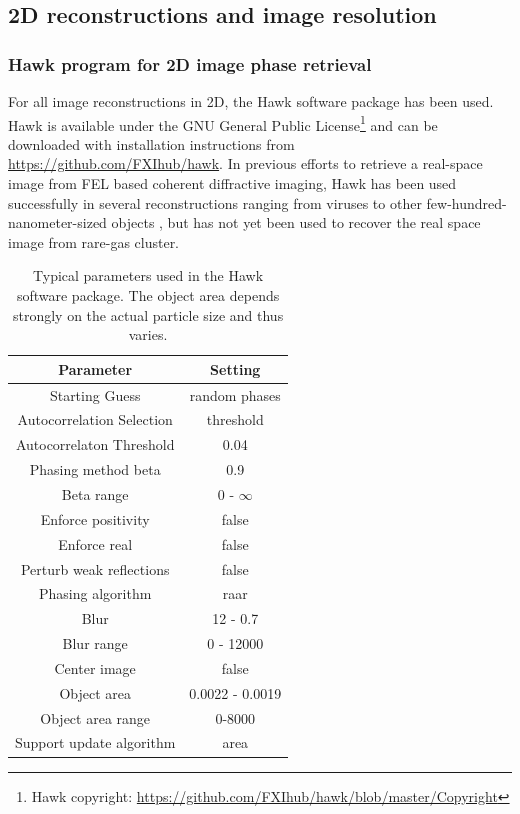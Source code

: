 \subsection{2D reconstructions and image resolution}
%
%
%
\subsubsection{Hawk program for 2D image phase retrieval}
For all image reconstructions in 2D, the Hawk software package \citep{Maia-2010-JAC} has been used. Hawk is available under the GNU General Public License\footnote{Hawk copyright: \url{https://github.com/FXIhub/hawk/blob/master/Copyright}} and can be downloaded with installation instructions from \url{https://github.com/FXIhub/hawk}. In previous efforts to retrieve a real-space image from FEL based coherent diffractive imaging, Hawk has been used successfully in several reconstructions ranging from viruses \citep{Seibert-2011-Nature,Ekeberg-2015-PRL} to other few-hundred-nanometer-sized objects \citep{Seibert-2010-JPhysB}, but has not yet been used to recover the real space image from rare-gas cluster.
\begin{table}%
\centering
\begin{tabular}{ |c|c|}
 \hline
 \textbf{Parameter} & \textbf{Setting} \\ 
 \hline
 Starting Guess & random phases \\ \hline
 Autocorrelation Selection & threshold \\ \hline
 Autocorrelaton Threshold & 0.04  \\ \hline
 Phasing method beta & 0.9  \\ \hline
 Beta range & 0 - $\infty$ \\ \hline
 Enforce positivity & false   \\ \hline
 Enforce real & false     \\\hline
Perturb weak reflections & false \\ \hline
Phasing algorithm & raar \\ \hline
Blur & 12 - 0.7 \\ \hline
Blur range & 0 - 12000 \\ \hline
Center image & false \\ \hline
Object area & 0.0022 - 0.0019 \\ \hline
Object area range & 0-8000\\ \hline
Support update algorithm & area \\ \hline
\end{tabular}
\caption[Typical parameters used in the Hawk software package.]{Typical parameters used in the Hawk software package. The object area depends strongly on the actual particle size and thus varies.}
\label{tab:hawk-parameter}
\end{table}
